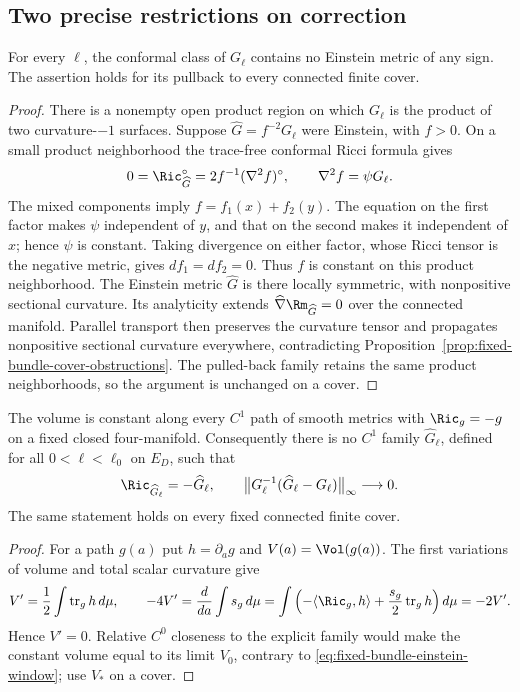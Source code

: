 \subsection{Two precise restrictions on correction}

\begin{proposition}\label{prop:fixed-bundle-conformal-exclusion}
For every $\ell$, the conformal class of $G_\ell$ contains no
Einstein metric of any sign.  The assertion holds for its pullback
to every connected finite cover.
\end{proposition}

\begin{proof}
There is a nonempty open product region on which $G_\ell$ is the
product of two curvature-$-1$ surfaces.  Suppose
$\widehat G=f^{-2}G_\ell$ were Einstein, with $f>0$.  On a small
product neighborhood the trace-free conformal Ricci formula gives
\[
 0=\Ric_{\widehat G}^{\circ}
   =2f^{-1}(\nabla^2f)^\circ,
 \qquad \nabla^2f=\psi G_\ell.
\]
The mixed components imply $f=f_1(x)+f_2(y)$.  The equation on the
first factor makes $\psi$ independent of $y$, and that on the
second makes it independent of $x$; hence $\psi$ is constant.
Taking divergence on either factor, whose Ricci tensor is the
negative metric, gives $df_1=df_2=0$.  Thus $f$ is constant on
this product neighborhood.  The Einstein metric $\widehat G$ is
there locally symmetric, with nonpositive sectional curvature.
Its analyticity \cite{DeTurckKazdan} extends
$\widehat\nabla\Rm_{\widehat G}=0$ over the connected manifold.
Parallel transport then preserves the curvature tensor and
propagates nonpositive sectional curvature everywhere, contradicting
Proposition~\ref{prop:fixed-bundle-cover-obstructions}.  The
pulled-back family retains the same product neighborhoods, so the
argument is unchanged on a cover.
\end{proof}

\begin{proposition}\label{prop:fixed-bundle-path-exclusion}
The volume is constant along every $C^1$ path of smooth metrics
with $\Ric_g=-g$ on a fixed closed four-manifold.  Consequently
there is no $C^1$ family $\widehat G_\ell$, defined for all
$0<\ell<\ell_0$ on $E_D$, such that
\[
 \Ric_{\widehat G_\ell}=-\widehat G_\ell,\qquad
 \bigl\|G_\ell^{-1}(\widehat G_\ell-G_\ell)\bigr\|_\infty
       \longrightarrow0.
\]
The same statement holds on every fixed connected finite cover.
\end{proposition}

\begin{proof}
For a path $g(a)$ put $h=\partial_ag$ and $V(a)=\Vol(g(a))$.
The first variations of volume and total scalar curvature give
\[
 V'=\frac12\int\operatorname{tr}_gh\,d\mu,\qquad
 -4V'=\frac d{da}\int s_g\,d\mu
 =\int\left(-\langle\Ric_g,h\rangle
           +\frac{s_g}{2}\operatorname{tr}_gh\right)d\mu
 =-2V'.
\]
Hence $V'=0$.  Relative $C^0$ closeness to the explicit family
would make the constant volume equal to its limit $V_0$, contrary
to \eqref{eq:fixed-bundle-einstein-window}; use $V_*$ on a cover.
\end{proof}

